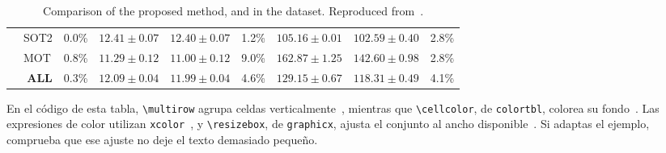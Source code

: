 \begin{table}[h]
{\begin{tabular}{cl|ccc|ccc|c}
      \multicolumn{1}{|c|}{}                                                   & SOT2                                                  & \multicolumn{1}{c|}{0.0\%}                                                        & \multicolumn{1}{c|}{$12.41\pm0.07$}                                                 & $12.40\pm0.07$                                                 & \multicolumn{1}{c|}{1.2\%}                                                        & \multicolumn{1}{c|}{$105.16\pm0.01$}                                                & $102.59\pm0.40$                                                & \multicolumn{1}{c|}{2.8\%}                                                          \\ \cline{2-9}
      \multicolumn{1}{|c|}{}                                                   & MOT                                                   & \multicolumn{1}{c|}{0.8\%}                                                        & \multicolumn{1}{c|}{$11.29\pm0.12$}                                                 & $11.00\pm0.12$                                                 & \multicolumn{1}{c|}{9.0\%}                                                        & \multicolumn{1}{c|}{$162.87\pm1.25$}                                                & $142.60\pm0.98$                                                & \multicolumn{1}{c|}{2.8\%}                                                          \\ \cline{2-9}
      \multicolumn{1}{|c|}{\multirow{-4}{*}{\AVThreeTVLoc{}}} & \multicolumn{1}{r|}{\textbf{ALL}}                              & \multicolumn{1}{c|}{0.3\%}                                                        & \multicolumn{1}{c|}{$12.09\pm0.04$}                                                 & $11.99\pm0.04$                                                 & \multicolumn{1}{c|}{4.6\%}                                                        & \multicolumn{1}{c|}{$129.15\pm0.67$}                                                & $118.31\pm0.49$                                                & \multicolumn{1}{c|}{4.1\%}                                                          \\ \hline
    \end{tabular}
  }
  \caption{Comparison of the proposed \LandPoseVLoc{} method, and \AVThreeTVLoc{} in the \CAVDB{} dataset. Reproduced from~\cite{Sanabria2026Landmark}.}
  \label{tab:MethodSummaryCAV3D}
\end{table}


En el código de esta tabla, \texttt{\textbackslash{}multirow} agrupa celdas verticalmente~\cite{multirow-manual}, mientras que \texttt{\textbackslash{}cellcolor}, de \texttt{colortbl}, colorea su fondo~\cite{colortbl-manual}. Las expresiones de color utilizan \texttt{xcolor}~\cite{xcolor-manual}, y \texttt{\textbackslash{}resizebox}, de \texttt{graphicx}, ajusta el conjunto al ancho disponible~\cite{graphicx-manual}. Si adaptas el ejemplo, comprueba que ese ajuste no deje el texto demasiado pequeño.

